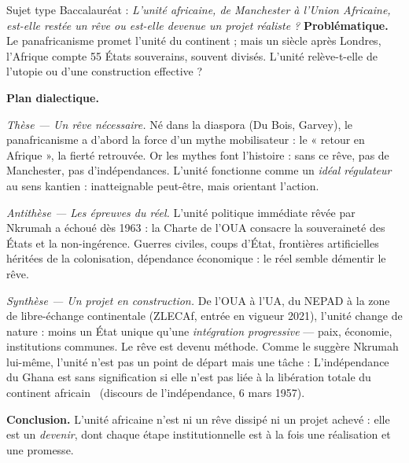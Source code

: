 \documentclass[11pt]{article}
\begin{document}
\begin{exoresolu}
Sujet type Baccalauréat : \emph{L'unité africaine, de Manchester à l'Union Africaine, est-elle restée un rêve ou est-elle devenue un projet réaliste ?}
\tcblower
\textbf{Problématique.} Le panafricanisme promet l'unité du continent ; mais un siècle après Londres, l'Afrique compte 55 États souverains, souvent divisés. L'unité relève-t-elle de l'utopie ou d'une construction effective ?

\textbf{Plan dialectique.}

\emph{Thèse — Un rêve nécessaire.} Né dans la diaspora (Du Bois, Garvey), le panafricanisme a d'abord la force d'un mythe mobilisateur : le « retour en Afrique », la fierté retrouvée. Or les mythes font l'histoire : sans ce rêve, pas de Manchester, pas d'indépendances. L'unité fonctionne comme un \emph{idéal régulateur} au sens kantien : inatteignable peut-être, mais orientant l'action.

\emph{Antithèse — Les épreuves du réel.} L'unité politique immédiate rêvée par Nkrumah a échoué dès 1963 : la Charte de l'OUA consacre la souveraineté des États et la non-ingérence. Guerres civiles, coups d'État, frontières artificielles héritées de la colonisation, dépendance économique : le réel semble démentir le rêve.

\emph{Synthèse — Un projet en construction.} De l'OUA à l'UA, du NEPAD à la zone de libre-échange continentale (ZLECAf, entrée en vigueur 2021), l'unité change de nature : moins un État unique qu'une \emph{intégration progressive} — paix, économie, institutions communes. Le rêve est devenu méthode. Comme le suggère Nkrumah lui-même, l'unité n'est pas un point de départ mais une tâche : \guillemotleft L'indépendance du Ghana est sans signification si elle n'est pas liée à la libération totale du continent africain \guillemotright\ (discours de l'indépendance, 6 mars 1957).

\textbf{Conclusion.} L'unité africaine n'est ni un rêve dissipé ni un projet achevé : elle est un \emph{devenir}, dont chaque étape institutionnelle est à la fois une réalisation et une promesse.
\end{exoresolu}
\end{document}
